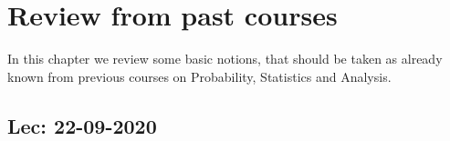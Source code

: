 \documentclass[a4paper,11pt]{report}
\begin{document}
	\tableofcontents
		
	\chapter*{Review from past courses}
	
	In this chapter we review some basic notions, that should be taken as already known from previous courses on Probability, Statistics and Analysis.
	
	\section{Lec: 22-09-2020}
%		
		
		
	
		
		
\end{document}
